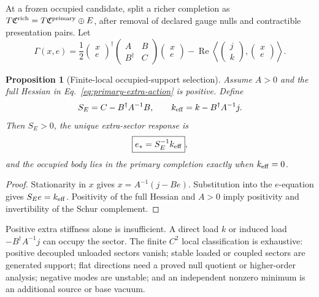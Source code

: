 \documentclass[11pt]{article}
\newtheorem{proposition}{Proposition}
\begin{document}
At a frozen occupied candidate, split a richer completion as
\(T\mathfrak C^{\rm rich}=T\mathfrak C^{\rm primary}\oplus E\), after
removal of declared gauge nulls and contractible presentation pairs. Let
\begin{equation}
 \Gamma(x,e)=\frac12
 \begin{pmatrix}x\\e\end{pmatrix}^{\!\dagger}
 \begin{pmatrix}A&B\\B^\dagger&C\end{pmatrix}
 \begin{pmatrix}x\\e\end{pmatrix}
 -\operatorname{Re}\left\langle
 \begin{pmatrix}j\\k\end{pmatrix},
 \begin{pmatrix}x\\e\end{pmatrix}\right\rangle .
 \label{eq:primary-extra-action}
\end{equation}

\begin{proposition}[Finite-local occupied-support selection]
Assume \(A>0\) and the full Hessian in
Eq.~\eqref{eq:primary-extra-action} is positive. Define
\[
 S_E=C-B^\dagger A^{-1}B,
 \qquad k_{\rm eff}=k-B^\dagger A^{-1}j.
\]
Then \(S_E>0\), the unique extra-sector response is
\begin{equation}
 \boxed{e_*=S_E^{-1}k_{\rm eff}},
 \label{eq:extra-sector-solution}
\end{equation}
and the occupied body lies in the primary completion exactly when
\(k_{\rm eff}=0\).
\end{proposition}

\begin{proof}
Stationarity in \(x\) gives \(x=A^{-1}(j-Be)\). Substitution into the
\(e\)-equation gives \(S_Ee=k_{\rm eff}\). Positivity of the full Hessian and
\(A>0\) imply positivity and invertibility of the Schur complement.
\end{proof}

Positive extra stiffness alone is insufficient. A direct load \(k\) or
induced load \(-B^\dagger A^{-1}j\) can occupy the sector. The finite
\(C^2\) local classification is exhaustive: positive decoupled unloaded
sectors vanish; stable loaded or coupled sectors are generated support; flat
directions need a proved null quotient or higher-order analysis; negative
modes are unstable; and an independent nonzero minimum is an additional
source or base vacuum.
\end{document}
